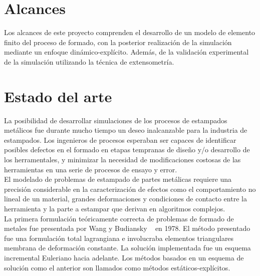 \section{Alcances}

Los alcances de este proyecto comprenden el desarrollo de un modelo de elemento finito del proceso de 
formado, con la posterior realización de la simulación mediante un enfoque dinámico-explícito. Además, 
de la validación experimental de la simulación utilizando la técnica de extensometría.



\section{Estado del arte}

La posibilidad de desarrollar simulaciones de los procesos de estampados metálicos fue durante mucho tiempo 
un deseo inalcanzable para la industria de estampados. Los ingenieros de procesos esperaban ser capaces de 
identificar posibles defectos en el formado en etapas tempranas de diseño y/o desarrollo de los herramentales, 
y minimizar la necesidad de modificaciones costosas de las herramientas en una serie de procesos de ensayo y error. \\

El modelado de problemas de estampado de partes metálicas requiere una precisión considerable en la caracterización 
de efectos como el comportamiento no lineal de un material, grandes deformaciones y condiciones de contacto entre la
herramienta y la parte a estampar que derivan  en algoritmos complejos.\cite{banabic2000}\\

La primera formulación teóricamente correcta de problemas de formado de metales fue presentada por 
Wang y Budiansky ~\cite{wang1978} en 1978. El método presentado fue una formulación total lagrangiana 
e involucraba elementos triangulares membrana de deformación constante. La solución implementada fue 
un esquema incremental Euleriano hacia adelante. Los métodos basados en un 
esquema de solución como el anterior son llamados como métodos estáticos-explícitos. \\

